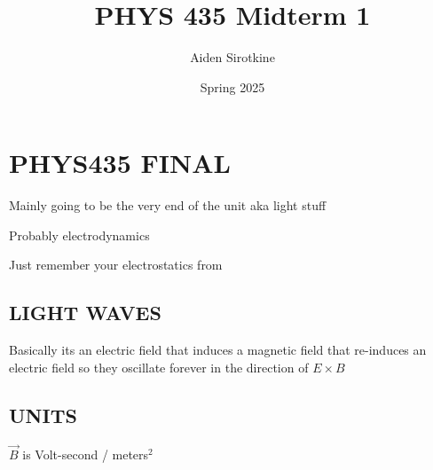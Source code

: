 \documentclass[fleqn]{report}
\date{Spring 2025}
\title{PHYS 435 Midterm 1}
\author{Aiden Sirotkine}
\begin{document}
\pagestyle{fancy}
\maketitle
\tableofcontents
\clearpage

\chapter{PHYS435 FINAL}

Mainly going to be the very end of the unit aka light stuff 

Probably electrodynamics 

Just remember your electrostatics from 

\section{LIGHT WAVES}
Basically its an electric field that induces a magnetic field that re-induces 
    an electric field so they oscillate forever in the direction of $E \times B$ 



\section{UNITS}
$\vec B$ is Volt-second / meters$^2$
\end{document}
